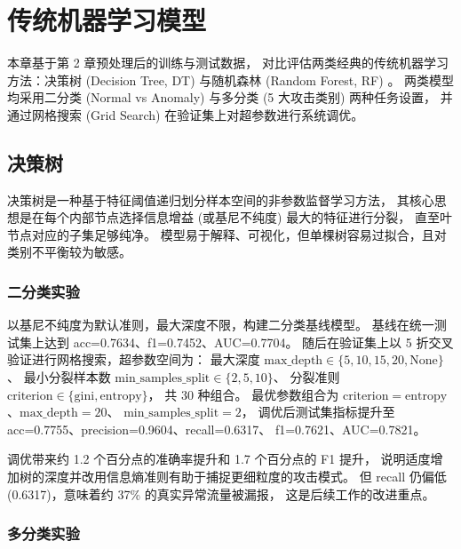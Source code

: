 
\section{传统机器学习模型}

本章基于第 2 章预处理后的训练与测试数据，
对比评估两类经典的传统机器学习方法：决策树 (Decision Tree, DT) 与随机森林 (Random Forest, RF) \cite{scikit-learn}。
两类模型均采用二分类 (Normal vs Anomaly) 与多分类 (5 大攻击类别) 两种任务设置，
并通过网格搜索 (Grid Search) 在验证集上对超参数进行系统调优。

\subsection{决策树}

决策树是一种基于特征阈值递归划分样本空间的非参数监督学习方法，
其核心思想是在每个内部节点选择信息增益 (或基尼不纯度) 最大的特征进行分裂，
直至叶节点对应的子集足够纯净。
模型易于解释、可视化，但单棵树容易过拟合，且对类别不平衡较为敏感。

\subsubsection{二分类实验}

以基尼不纯度为默认准则，最大深度不限，构建二分类基线模型。
基线在统一测试集上达到 acc=0.7634、f1=0.7452、AUC=0.7704。
随后在验证集上以 5 折交叉验证进行网格搜索，超参数空间为：
最大深度 $\mathrm{max\_depth} \in \{5, 10, 15, 20, \mathrm{None}\}$、
最小分裂样本数 $\mathrm{min\_samples\_split} \in \{2, 5, 10\}$、
分裂准则 $\mathrm{criterion} \in \{\mathrm{gini}, \mathrm{entropy}\}$，
共 30 种组合。
最优参数组合为 $\mathrm{criterion}=\mathrm{entropy}$、$\mathrm{max\_depth}=20$、
$\mathrm{min\_samples\_split}=2$，
调优后测试集指标提升至 acc=0.7755、precision=0.9604、recall=0.6317、
f1=0.7621、AUC=0.7821。

调优带来约 1.2 个百分点的准确率提升和 1.7 个百分点的 F1 提升，
说明适度增加树的深度并改用信息熵准则有助于捕捉更细粒度的攻击模式。
但 recall 仍偏低 (0.6317)，意味着约 37\% 的真实异常流量被漏报，
这是后续工作的改进重点。

\subsubsection{多分类实验}

